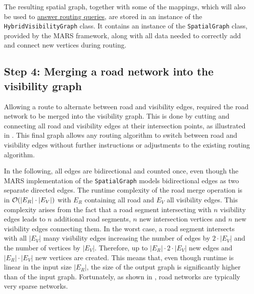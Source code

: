 		The resulting spatial graph, together with some of the mappings, which will also be used to \hyperref[sec:answering-queries]{answer routing queries}, are stored in an instance of the \texttt{HybridVisibilityGraph} class.
		It contains an instance of the \texttt{SpatialGraph} class, provided by the MARS framework, along with all data needed to correctly add and connect new vertices during routing.
		
	\subsection{Step 4: Merging a road network into the visibility graph}
	\label{subsec:step-4-graph merging}
	
		Allowing a route to alternate between road and visibility edges, required the road network to be merged into the visibility graph.
		This is done by cutting and connecting all road and visibility edges at their intersection points, as illustrated in .
		This final graph allows any routing algorithm to switch between road and visibility edges without further instructions or adjustments to the existing routing algorithm.

		In the following, all edges are bidirectional and counted once, even though the MARS implementation of the \texttt{SpatialGraph} models bidirectional edges as two separate directed edges.
		The runtime complexity of the road merge operation is in $\mathcal{O}(|E_R| \cdot |E_V|)$ with $E_R$ containing all road and $E_V$ all visibility edges.
		This complexity arises from the fact that a road segment intersecting with $n$ visibility edges leads to $n$ additional road segments, $n$ new intersection vertices and $n$ new visibility edges connecting them.
		In the worst case, a road segment intersects with all $|E_V|$ many visibility edges increasing the number of edges by $2 \cdot |E_V|$ and the number of vertices by $|E_V|$.
		Therefore, up to $|E_R| \cdot 2 \cdot |E_V|$ new edges and $|E_R| \cdot |E_V|$ new vertices are created.
		This means that, even though runtime is linear in the input size $|E_R|$, the size of the output graph is significantly higher than of the input graph.
		Fortunately, as shown in , road networks are typically very sparse networks.
		
